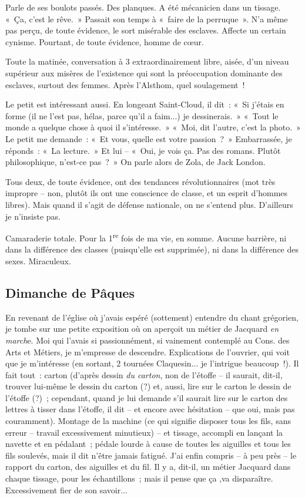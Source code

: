\documentclass[french,twoside]{book} %
\begin{document}
Parle de ses boulots passés. Des planques. A été mécanicien dans un tissage. « Ça, c'est le rêve. » Passait son temps à « faire de la perruque ». N'a même pas perçu, de toute évidence, le sort misérable des esclaves. Affecte un certain cynisme. Pourtant, de toute évidence, homme de cœur.\par
Toute la matinée, conversation à 3 extraordinairement libre, aisée, d'un niveau supérieur aux misères de l'existence qui sont la préoccupation dominante des esclaves, surtout des femmes. Après l'Alsthom, quel soulagement !\par
Le petit est intéressant aussi. En longeant Saint-Cloud, il dit : « Si j'étais en forme (il ne l'est pas, hélas, parce qu'il a faim...) je dessinerais. » « Tout le monde a quelque chose à quoi il s'intéresse. » « Moi, dit l'autre, c'est la photo. » Le petit me demande : « Et vous, quelle est votre passion ? » Embarrassée, je réponds : « La lecture. » Et lui – « Oui, je vois ça. Pas des romans. Plutôt philosophique, n'est-ce pas ? » On parle alors de Zola, de Jack London.\par
Tous deux, de toute évidence, ont des tendances révolutionnaires (mot très impropre – non, plutôt ils ont une conscience de classe, et un esprit d'hommes libres). Mais quand il s'agit de défense nationale, on ne s'entend plus. D'ailleurs je n'insiste pas.\par
Camaraderie totale. Pour la 1\textsuperscript{re} fois de ma vie, en somme. Aucune barrière, ni dans la différence des classes (puisqu'elle est supprimée), ni dans la différence des sexes. Miraculeux.
\subsection[Dimanche de Pâques]{Dimanche de Pâques}
\noindent \par
En revenant de l'église où j'avais espéré (sottement) entendre du chant grégorien, je tombe sur une petite exposition où on aperçoit un métier de Jacquard {\itshape en march}e. Moi qui l'avais si passionnément, si vainement contemplé au Cons. des Arts et Métiers, je m'empresse de descendre. Explications de l'ouvrier, qui voit que je m'intéresse (en sortant, 2 tournées Claquesin... je l'intrigue beaucoup !). Il fait tout : carton (d'après dessin {\itshape du carton}, non de l'étoffe – il saurait, dit-il, trouver lui-même le dessin du carton (?) et, aussi, lire sur le carton le dessin de l'étoffe (?) ; cependant, quand je lui demande s'il saurait lire sur le carton des lettres à tisser dans l'étoffe, il dit – et encore avec hésitation – que oui, mais pas couramment). Montage de la machine (ce qui signifie disposer tous les fils, sans erreur – travail excessivement minutieux) – et tissage, accompli en lançant la navette et en pédalant ; pédale lourde à cause de toutes les aiguilles et tous les fils soulevés, mais il dit n'être jamais fatigué. J'ai enfin compris – à peu près – le rapport du carton, des aiguilles et du fil. Il y a, dit-il, un métier Jacquard dans chaque tissage, pour les échantillons ; mais il pense que ça ,va disparaître. Excessivement fier de son savoir...
\end{document}
